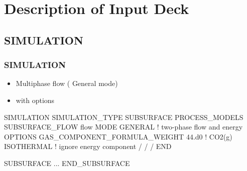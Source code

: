 \documentclass{beamer}
\newcommand\redcomment[1]{{{\color{red} #1}}}
\newcommand\bluecomment[1]{{{\color{blue} #1}}}
\begin{document}

\section{Description of Input Deck}

\subsection{SIMULATION}

\begin{frame}[fragile]\frametitle{SIMULATION}

\begin{itemize}
  \item Multiphase flow (\redcomment{General mode})
  \item with \redcomment{options}
\end{itemize}

\begin{semiverbatim}\small
SIMULATION
  SIMULATION_TYPE SUBSURFACE
  PROCESS_MODELS
    SUBSURFACE_FLOW flow
      MODE GENERAL \bluecomment{! two-phase flow and energy}
      OPTIONS
        GAS_COMPONENT_FORMULA_WEIGHT 44.d0 \bluecomment{! CO2(g)} 
        ISOTHERMAL \bluecomment{! ignore energy component}
      /   
    /   
  /
END

SUBSURFACE
...
END_SUBSURFACE
\end{semiverbatim}

\end{frame}
\end{document}
